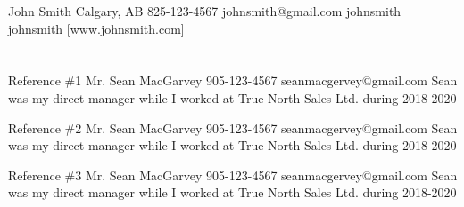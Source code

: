 \documentclass[letterpaper]{resume_config}
\begin{document}
\Header
    {John Smith} %
    {Calgary, AB} %
    {825-123-4567} %
    {johnsmith@gmail.com} %
    {johnsmith} %
    {johnsmith} %
    [www.johnsmith.com] %

\section{}

\bigskip %
\bigskip %



\References
{Reference \#1}
{Mr. Sean MacGarvey} %
{905-123-4567} %
{seanmacgervey@gmail.com} %
{Sean was my direct manager while I worked at True North Sales Ltd. during 2018-2020} %

\References
{Reference \#2}
{Mr. Sean MacGarvey} %
{905-123-4567} %
{seanmacgervey@gmail.com} %
{Sean was my direct manager while I worked at True North Sales Ltd. during 2018-2020} %

\References
{Reference \#3}
{Mr. Sean MacGarvey} %
{905-123-4567} %
{seanmacgervey@gmail.com} %
{Sean was my direct manager while I worked at True North Sales Ltd. during 2018-2020} %
\end{document}
